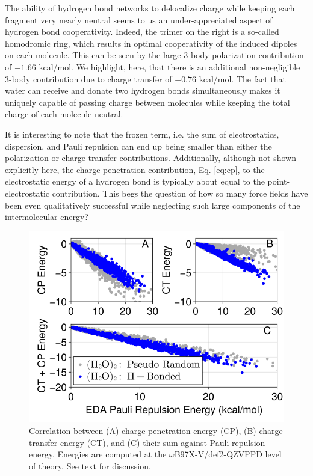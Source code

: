 \documentclass[journal=jacsat,manuscript=article]{achemso}
\begin{document}
The ability of hydrogen bond networks
to delocalize charge while keeping each fragment very nearly neutral seems to us
an under-appreciated aspect of hydrogen bond cooperativity. Indeed, the trimer on the right
is a so-called homodromic ring, which results in optimal cooperativity
of the induced dipoles on each molecule.\cite{xantheas2000cooperativity} This can be
seen by the large 3-body polarization contribution of $-1.66$ kcal/mol. We highlight, here,
that there is an additional non-negligible 3-body contribution due to charge transfer of
$-0.76$ kcal/mol. The fact that water can receive and donate two hydrogen bonds simultaneously
makes it uniquely capable of passing charge between molecules while keeping the total charge
of each molecule neutral.

It is interesting to note that the frozen term, i.e. the sum of electrostatics, dispersion, and
Pauli repulsion can end up being smaller than either the polarization or charge transfer contributions.
Additionally, although not shown explicitly here, the charge penetration contribution, Eq. \ref{eq:cp}, to the
electrostatic energy of a hydrogen bond is typically about equal to the point-electrostatic contribution.
This begs the question of how so many force fields have been even qualitatively successful while
neglecting such large components of the intermolecular energy?

\begin{figure}[H]
  \includegraphics*[width=\textwidth]{figures/pauli_ct_cp_correlation.png}
  \caption{Correlation between (A) charge penetration energy (CP), (B) charge transfer energy (CT),
  and (C) their sum against Pauli repulsion energy.
  Energies are computed at the $\omega$B97X-V/def2-QZVPPD level of theory. See text for discussion.}
  \label{fig:cp_ct_pauli}
\end{figure}
\end{document}
